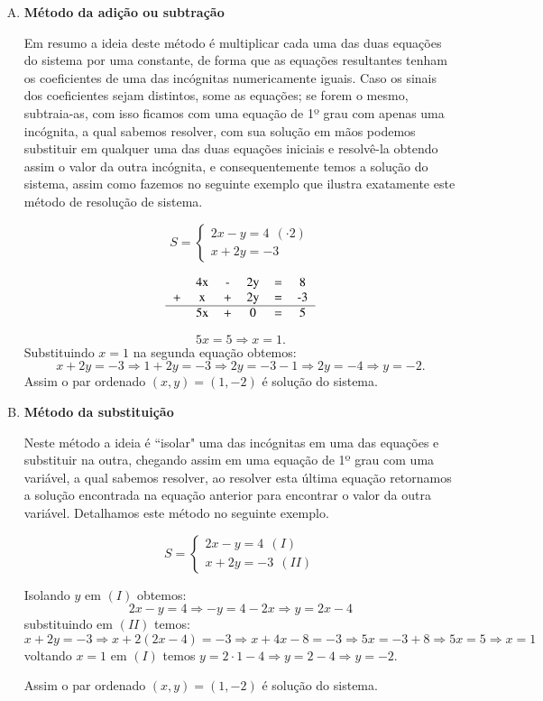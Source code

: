 \begin{enumerate}[A)]
 \item \textbf{Método da adição ou subtração}

 Em resumo a ideia deste método é multiplicar cada uma das duas equações do sistema por uma constante, de forma que as equações resultantes tenham os coeficientes de uma das incógnitas numericamente iguais. Caso os sinais dos coeficientes sejam distintos, some as equações; se forem o mesmo, subtraia-as, com isso ficamos com uma equação de 1º grau com apenas uma incógnita, a qual sabemos resolver, com sua solução em mãos podemos substituir em qualquer uma das duas equações iniciais e resolvê-la obtendo assim o valor da outra incógnita, e consequentemente temos a solução do sistema, assim como fazemos no seguinte exemplo que ilustra exatamente este método de resolução de sistema.

 \[S= \begin{cases}
      2x - y= 4 \ \ (\cdot 2)\\
      x + 2y= -3
     \end{cases}\]

$$\begin{tabular}{cccccc}
   & 4x & -  & 2y  & =  & 8  \\
 + & x & + & 2y & = & -3 \\\hline
   & 5x & + & 0 & = & 5 \\
\end{tabular}$$

\[5x= 5 \Rightarrow x=1.\]
Substituindo $x=1$ na segunda equação obtemos:
\[x + 2y= -3 \Rightarrow 1 + 2y= -3 \Rightarrow 2y = -3 -1 \Rightarrow 2y= -4 \Rightarrow y=-2.\]
Assim o par ordenado $(x, y)= (1, -2)$ é solução do sistema.

 \item \textbf{Método da substituição}

 Neste método a ideia é ``isolar" uma das incógnitas em uma das equações e substituir na outra, chegando assim em uma equação de 1º grau com uma variável, a qual sabemos resolver, ao resolver esta última equação retornamos a solução encontrada na equação anterior para encontrar o valor da outra variável. Detalhamos este método no seguinte exemplo.

 \[S= \begin{cases}
      2x - y= 4 \ \ (I)\\
      x + 2y= -3 \ \ (II)
     \end{cases}\]

 Isolando $y$ em $(I)$ obtemos:
 \[2x - y= 4 \Rightarrow -y = 4 -2x \Rightarrow y = 2x -4\]
 substituindo em $(II)$ temos:
 \[x + 2y= -3 \Rightarrow x + 2(2x - 4)= -3 \Rightarrow x + 4x - 8= -3 \Rightarrow 5x= -3 + 8 \Rightarrow 5x=5 \Rightarrow x=1\]
 voltando $x= 1$ em $(I)$ temos $y= 2 \cdot 1 - 4 \Rightarrow  y= 2 -4 \Rightarrow y= -2$.

 Assim o par ordenado $(x, y)= (1, -2)$ é solução do sistema.
\end{enumerate}

